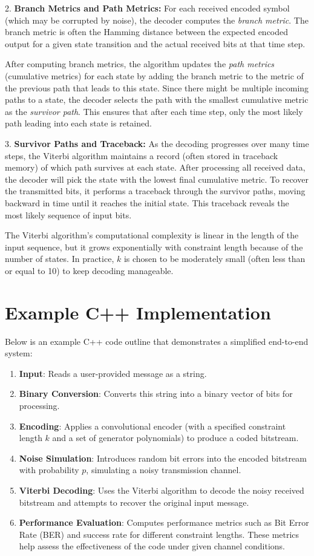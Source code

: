 \documentclass[12pt,a4paper]{article}
\begin{document}
2. \textbf{Branch Metrics and Path Metrics:}  
   For each received encoded symbol (which may be corrupted by noise), the decoder computes the \emph{branch metric}. The branch metric is often the Hamming distance between the expected encoded output for a given state transition and the actual received bits at that time step.

   After computing branch metrics, the algorithm updates the \emph{path metrics} (cumulative metrics) for each state by adding the branch metric to the metric of the previous path that leads to this state. Since there might be multiple incoming paths to a state, the decoder selects the path with the smallest cumulative metric as the \emph{survivor path}. This ensures that after each time step, only the most likely path leading into each state is retained.

3. \textbf{Survivor Paths and Traceback:}  
   As the decoding progresses over many time steps, the Viterbi algorithm maintains a record (often stored in traceback memory) of which path survives at each state. After processing all received data, the decoder will pick the state with the lowest final cumulative metric. To recover the transmitted bits, it performs a traceback through the survivor paths, moving backward in time until it reaches the initial state. This traceback reveals the most likely sequence of input bits.

   The Viterbi algorithm's computational complexity is linear in the length of the input sequence, but it grows exponentially with constraint length because of the number of states. In practice, $k$ is chosen to be moderately small (often less than or equal to 10) to keep decoding manageable.

\section{Example C++ Implementation}

Below is an example C++ code outline that demonstrates a simplified end-to-end system:
\begin{enumerate}
    \item \textbf{Input}: Reads a user-provided message as a string.
    \item \textbf{Binary Conversion}: Converts this string into a binary vector of bits for processing.
    \item \textbf{Encoding}: Applies a convolutional encoder (with a specified constraint length $k$ and a set of generator polynomials) to produce a coded bitstream.
    \item \textbf{Noise Simulation}: Introduces random bit errors into the encoded bitstream with probability $p$, simulating a noisy transmission channel.
    \item \textbf{Viterbi Decoding}: Uses the Viterbi algorithm to decode the noisy received bitstream and attempts to recover the original input message.
    \item \textbf{Performance Evaluation}: Computes performance metrics such as Bit Error Rate (BER) and success rate for different constraint lengths. These metrics help assess the effectiveness of the code under given channel conditions.
\end{enumerate}
\end{document}
